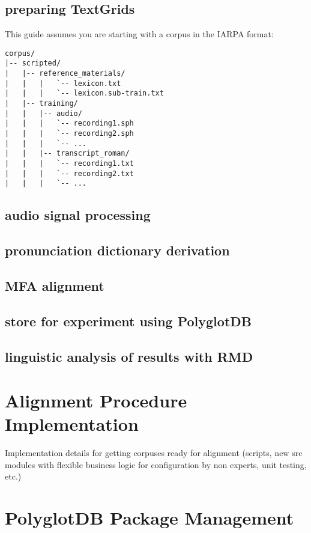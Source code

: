 \documentclass[twoside,11pt]{article}
\begin{document}
\subsection{preparing TextGrids}

This guide assumes you are starting with a corpus in the IARPA format:

\begin{verbatim}
corpus/
|-- scripted/
|   |-- reference_materials/
|   |   |   `-- lexicon.txt
|   |   |   `-- lexicon.sub-train.txt
|   |-- training/
|   |   |-- audio/
|   |   |   `-- recording1.sph
|   |   |   `-- recording2.sph
|   |   |   `-- ...
|   |   |-- transcript_roman/
|   |   |   `-- recording1.txt
|   |   |   `-- recording2.txt
|   |   |   `-- ...
\end{verbatim}


\subsection{audio signal processing}
\subsection{pronunciation dictionary derivation}
\subsection{MFA alignment}
\subsection{store for experiment using PolyglotDB}
\subsection{linguistic analysis of results with RMD}


\section{Alignment Procedure Implementation}

Implementation details for getting corpuses ready for alignment (scripts, new src modules with flexible business logic for configuration by non experts, unit testing, etc.)
\

\section{PolyglotDB Package Management}
\end{document}
